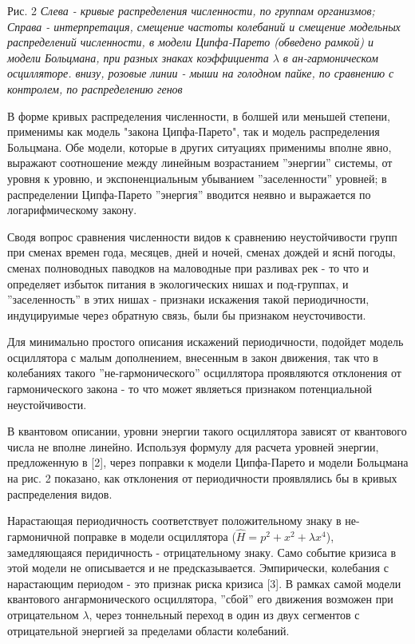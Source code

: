 \documentclass[a4paper]{article}
\begin{document}
Рис. 2 \textit{Слева - кривые распределения численности, по группам организмов; Справа - интерпретация, смещение частоты колебаний и смещение модельных распределений численности, в модели Ципфа-Парето (обведено рамкой) и модели Больцмана, при разных знаках коэффициента $\lambda$ в ан-гармоническом осцилляторе. внизу, розовые линии - мыши на голодном пайке, по сравнению с контролем, по распределению генов  }

В форме кривых распределения численности, в болшей или меньшей степени, применимы как модель "закона Ципфа-Парето", так и модель распределения Больцмана. Обе модели, которые в других ситуациях применимы вполне явно, выражают соотношение между линейным возрастанием ''энергии'' системы, от уровня к уровню, и экспоненциальным убыванием ''заселенности'' уровней; в распределении Ципфа-Парето ''энергия'' вводится неявно и выражается по логарифмическому закону. 

Сводя вопрос сравнения численности видов к сравнению неустойчивости групп при сменах времен года, месяцев, дней и ночей, сменах дождей и яснй погоды, сменах полноводных паводков на маловодные при разливах рек - то что и определяет избыток питания в экологических нишах и под-группах, и ''заселенность'' в этих нишах - признаки искажения такой периодичности, индуцируимые через обратную связь, были бы признаком неусточивости.

Для минимально простого описания искажений периодичности, подойдет модель осциллятора с малым дополнением, внесенным в закон движения, так что в колебаниях такого ''не-гармонического'' осциллятора проявляются отклонения от гармонического закона - то что может являеться признаком потенциальной неустойчивости.

В квантовом описании, уровни энергии такого осциллятора зависят от квантового числа не вполне линейно. Используя формулу для расчета уровней энергии, предложенную в [2], через поправки к модели Ципфа-Парето и модели Больцмана на рис. 2 показано, как отклонения от периодичности проявлялись бы в кривых распределения видов.

Нарастающая периодичность соответствует положительному знаку в не-гармоничной поправке в модели осциллятора ($\hat H = p^2 + x^2 + \lambda x^4$), замедляющаяся перидичность - отрицательному знаку. Само событие кризиса в этой модели не описывается и не предсказывается. Эмпирически, колебания с нарастающим периодом - это признак риска кризиса [3]. В рамках самой модели квантового ангармонического осциллятора, ''сбой'' его движения возможен при отрицательном $\lambda$, через тоннельный переход в один из двух сегментов с отрицательной энергией за пределами области колебаний.
\end{document}

